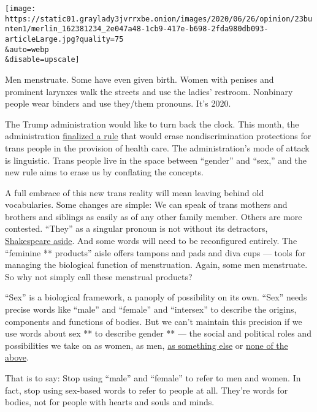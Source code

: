 \texttt{[image: https://static01.graylady3jvrrxbe.onion/images/2020/06/26/opinion/23bunten1/merlin\_162381234\_2e047a48-1cb9-417e-b698-2fda980db093-articleLarge.jpg?quality=75\\\&auto=webp\\\&disable=upscale]}

Men menstruate. Some have even given birth. Women with penises and
prominent larynxes walk the streets and use the ladies' restroom.
Nonbinary people wear binders and use they/them pronouns. It's 2020.

The Trump administration would like to turn back the clock. This month,
the administration
\href{https://www.nytimes3xbfgragh.onion/2020/06/12/us/politics/trump-transgender-rights.html}{finalized
a rule} that would erase nondiscrimination protections for trans people
in the provision of health care. The administration's mode of attack is
linguistic. Trans people live in the space between ``gender'' and
``sex,'' and the new rule aims to erase us by conflating the concepts.

A full embrace of this new trans reality will mean leaving behind old
vocabularies. Some changes are simple: We can speak of trans mothers and
brothers and siblings as easily as of any other family member. Others
are more contested. ``They'' as a singular pronoun is not without its
detractors,
\href{http://itre.cis.upenn.edu/~myl/languagelog/archives/002748.html}{Shakespeare
aside}. And some words will need to be reconfigured entirely. The
``feminine ** products'' aisle offers tampons and pads and diva cups ---
tools for managing the biological function of menstruation. Again, some
men menstruate. So why not simply call these menstrual products?

``Sex'' is a biological framework, a panoply of possibility on its own.
``Sex'' needs precise words like ``male'' and ``female'' and
``intersex'' to describe the origins, components and functions of
bodies. But we can't maintain this precision if we use words about sex
** to describe gender ** --- the social and political roles and
possibilities we take on as women, as men,
\href{https://www.nytimes3xbfgragh.onion/interactive/2018/11/16/magazine/tech-design-instagram-gender.html?action=click\&module=RelatedCoverage\&pgtype=Article\&region=Footer}{as
something else} or
\href{https://www.nytimes3xbfgragh.onion/2019/06/04/magazine/gender-nonbinary.html}{none
of the above}.

That is to say: Stop using ``male'' and ``female'' to refer to men and
women. In fact, stop using sex-based words to refer to people at all.
They're words for bodies, not for people with hearts and souls and
minds.


